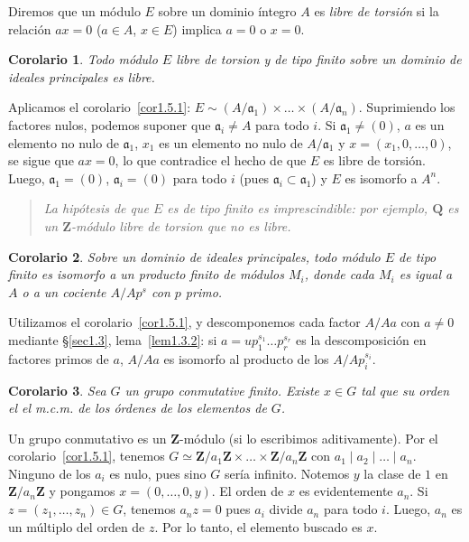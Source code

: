 \documentclass[bibtotoc,leqno,spanish]{amsbook}
\newcommand{\QQ}{\mathbf{Q}}
\newcommand{\ZZ}{\mathbf{Z}}
\newcommand{\idl}[1]{\mathfrak{#1}}
\numberwithin{equation}{section}
\newenvironment{comm}%
	{\begin{quotation}\itshape\Small}
	{\end{quotation}}
\theoremstyle{note}
\theoremstyle{note}
\newtheorem{corollary}{Corolario}
\theoremstyle{rem}
\numberwithin{theorem}{section}
\numberwithin{proposition}{section}
\numberwithin{definition}{section}
\numberwithin{lemma}{section}
\numberwithin{corollary}{section}
\numberwithin{example}{section}
\numberwithin{footnote}{section}%
\begin{document}
Diremos que un m\'odulo $E$ sobre un dominio \'integro $A$ es
{\em libre de torsi\'on} si la relaci\'on $ax = 0$
($a\in A$, $x\in E$) implica $a = 0$ o $x = 0$.

\begin{corollary}
Todo m\'odulo $E$ libre de torsion y de tipo finito
sobre un dominio de ideales principales es libre.
\end{corollary}

Aplicamos el corolario~\ref{cor1.5.1}: $E \sim (A/\idl{a}_{1})\times\dots
\times (A/\idl{a}_{n})$. Suprimiendo los factores nulos, podemos
suponer que $\idl{a}_{i}\neq A$ para todo $i$. Si $\idl{a}_{1}\neq(0)$,
$a$ es un elemento no nulo de $\idl{a}_{1}$,
$x_{1}$ es un elemento no nulo de $A/\idl{a}_{1}$ y
$x = (x_{1},0,\dots,0)$, se sigue que $ax = 0$, lo que contradice
el hecho de que $E$ es libre de torsi\'on. Luego,
$\idl{a}_{1} = (0)$, $\idl{a}_{i} = (0)$ para todo $i$ (pues
$\idl{a}_{i}\subset\idl{a}_{1}$) y $E$ es isomorfo a $A^{n}$.

\begin{comm}
La hip\'otesis de que $E$ es de tipo finito es imprescindible:
por ejemplo, $\QQ$ es un $\ZZ$-m\'odulo libre de torsion que no
es libre.
\end{comm}

\begin{corollary}
Sobre un dominio de ideales principales, todo m\'odulo $E$
de tipo finito es isomorfo a un producto finito de m\'odulos
$M_{i}$, donde cada $M_{i}$ es igual a $A$ o a un cociente
$A/Ap^{s}$ con $p$ primo.
\end{corollary}

Utilizamos el corolario~\ref{cor1.5.1}, y descomponemos cada factor
$A/Aa$ con $a\neq 0$ mediante \S\ref{sec1.3}, lema~\ref{lem1.3.2}: si
$a = up_{1}^{s_{1}}\dots p_{r}^{s_{r}}$ es la
descomposici\'on en factores primos de $a$, $A/Aa$ es
isomorfo al producto de los $A/Ap_{i}^{s_{i}}$.

\begin{corollary}\label{cor1.5.4}
Sea $G$ un grupo conmutative finito. Existe $x\in G$ tal que
su orden el el m.c.m. de los \'ordenes de los elementos de $G$.
\end{corollary}

Un grupo conmutativo es un $\ZZ$-m\'odulo (si lo escribimos
aditivamente). Por el corolario~\ref{cor1.5.1}, tenemos $G \simeq
\ZZ/a_{1}\ZZ\times\dots\times\ZZ/a_{n}\ZZ$ con
$a_{1}\mid a_{2}\mid\dots\mid a_{n}$. Ninguno de los $a_{i}$
es nulo, pues sino $G$ ser\'ia infinito. Notemos $y$ la
clase de $1$ en $\ZZ/a_{n}\ZZ$ y pongamos $x = (0,\dots,0,y)$.
El orden de $x$ es evidentemente $a_{n}$. Si $z = (z_{1},\dots,z_{n})\in G$,
tenemos $a_{n}z = 0$ pues $a_{i}$ divide $a_{n}$ para todo $i$.
Luego, $a_{n}$ es un m\'ultiplo del orden de $z$. Por lo tanto, el
elemento buscado es $x$.
\end{document}
